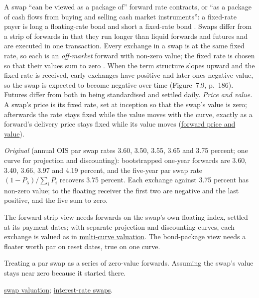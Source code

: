 \begin{qfdefinition}\label{def:swaps-as-forward-strips}
 A swap ``can be viewed as a package of'' forward rate contracts, or ``as a package of cash flows from buying and selling cash market instruments'': a fixed-rate payer is long a floating-rate bond and short a fixed-rate bond \citep[chap.~64, pp.~1577--1578]{s7-fabozzifixed}. Swaps differ from a strip of forwards in that they run longer than liquid forwards and futures and are executed in one transaction. Every exchange in a swap is at the same fixed rate, so each is an \emph{off-market} forward with non-zero value; the fixed rate is chosen so that their values sum to zero \citep[chap.~7, sec.~7.7, pp.~185--186]{s7-hulloptions}. When the term structure slopes upward and the fixed rate is received, early exchanges have positive and later ones negative value, so the swap is expected to become negative over time (Figure~7.9, p.~186). Futures differ from both in being standardised and settled daily. \emph{Price and value.} A swap's price is its fixed rate, set at inception so that the swap's value is zero; afterwards the rate stays fixed while the value moves with the curve, exactly as a forward's delivery price stays fixed while its value moves (\hyperref[meth:forward-price-value-lifecycle]{forward price and value}).

 \emph{Original} (annual OIS par swap rates 3.60, 3.50, 3.55, 3.65 and 3.75 percent; one curve for projection and discounting): bootstrapped one-year forwards are 3.60, 3.40, 3.66, 3.97 and 4.19 percent, and the five-year par swap rate $(1-P_5)/\sum_iP_i$ recovers 3.75 percent. Each exchange against 3.75 percent has non-zero value; to the floating receiver the first two are negative and the last positive, and the five sum to zero.

 The forward-strip view needs forwards on the swap's own floating index, settled at its payment dates; with separate projection and discounting curves, each exchange is valued as in \hyperref[mod:multi-curve-fra-swap-valuation]{multi-curve valuation}. The bond-package view needs a floater worth par on reset dates, true on one curve.

 Treating a par swap as a series of zero-value forwards. Assuming the swap's value stays near zero because it started there.

 \hyperref[meth:swap-valuation-replication]{swap valuation}; \hyperref[def:interest-rate-swaps]{interest-rate swaps}.

\end{qfdefinition}

